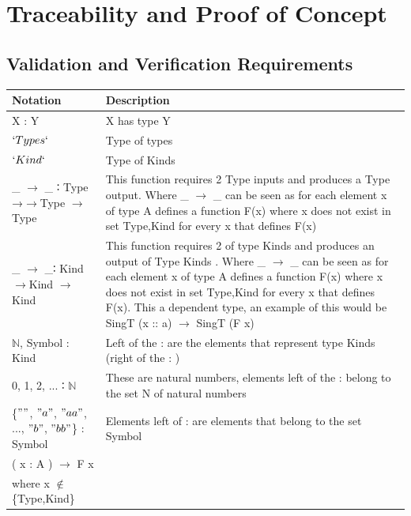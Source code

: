 \documentclass[12pt]{report}
\begin{document}
\chapter{Traceability and Proof of Concept}\label{ch:NonFunc}
\section{Validation and Verification Requirements}\label{sec:Verification}


\begin{longtable}{|m{5cm}|m{9cm}| }
    \hline 
    \textbf{Notation}  & \textbf{Description} \\ \hline
       X : Y   &  X has type Y \\ 
        \hline  
       $`Types`$  &  Type of types \\ 
        \hline
       $`Kind`$   &  Type of Kinds \\ 
        \hline
         \_ $\rightarrow$ \_ ∶ Type →$\rightarrow$Type $\rightarrow$ Type  & 
         This function requires 2 Type inputs and produces a Type output. Where 
         \_ $\rightarrow$ \_ can be seen as for each element x of type A 
         defines a function F(x) where x does not exist in set {Type,Kind} for 
         every x that defines F(x)  \\ 
        \hline
       \_ $\rightarrow$ \_∶ Kind $\rightarrow$Kind $\rightarrow$ Kind  & This 
       function requires 2 of type Kinds and produces an output of Type Kinds . 
       Where 
       \_ $\rightarrow$ \_ can be seen as for each element x of type A 
       defines a function F(x) where x does not exist in set {Type,Kind} for 
       every x that defines F(x). This a dependent type, an example of this 
       would be 
       SingT (x :: a) $\rightarrow$ SingT (F x)
       \\ 
        \hline
          $\mathbb{N}$, Symbol : Kind   &  Left of the : are the elements that 
          represent type Kinds (right of the : )\\ 
        \hline
          0, 1, 2, $...$ ∶ $\mathbb{N}$   &  These are natural numbers, 
          elements left of the : belong to the set N of natural numbers\\ 
        \hline
         \{$""$, $"a"$, $"aa"$, $...$, $"b"$, $"bb"$\} : Symbol &  
         Elements left of : are elements that belong to the set Symbol \\ 
        \hline
        ( x : A  ) $\rightarrow$ F x   & \\ where x $\notin$ \{Type,Kind\}   &  

\end{longtable}
\end{document}
